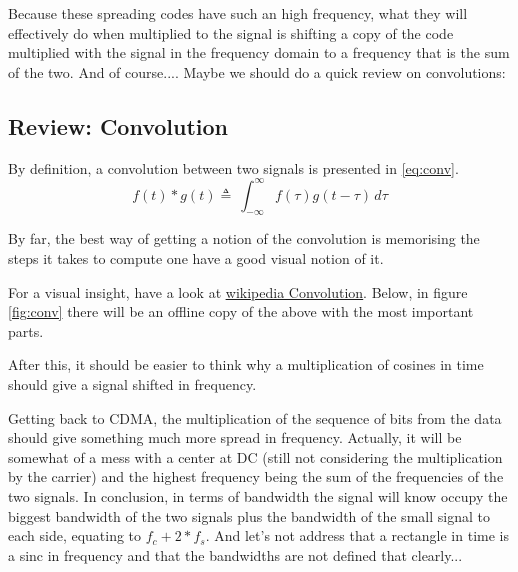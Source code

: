 \documentclass[12pt, a4paper]{article}
\begin{document}
\par Because these spreading codes have such an high frequency, what they will effectively do when multiplied to the signal is shifting a copy of the code multiplied with the signal in the frequency domain to a frequency that is the sum of the two. And of course.... Maybe we should do a quick review on convolutions:


\Vhrulefill
    \subsection{Review: Convolution}
    \par By definition, a convolution between two signals is presented in \eqref{eq:conv}.
    \begin{equation} \label{eq:conv}
        f(t) * g(t)\triangleq \ \int _{-\infty }^{\infty }f(\tau )g(t-\tau )\,d\tau
    \end{equation}

    \par By far, the best way of getting a notion of the convolution is memorising the steps it takes to compute one have a good visual notion of it.
    
    \par For a visual insight, have a look at \href{https://en.wikipedia.org/wiki/Convolution#Visual_explanation}{\ul{wikipedia Convolution}}. Below, in figure \ref{fig:conv} there will be an offline copy of the above with the most important parts.


    \par After this, it should be easier to think why a multiplication of cosines in time should give a signal shifted in frequency.

\Vhrulefill


\vspace{2cm}
\par Getting back to CDMA, the multiplication of the sequence of bits from the data should give something much more spread in frequency. Actually, it will be somewhat of a mess with a center at DC (still not considering the multiplication by the carrier) and the highest frequency being the sum of the frequencies of the two signals. In conclusion, in terms of bandwidth the signal will know occupy the biggest bandwidth of the two signals plus the bandwidth of the small signal to each side, equating to $f_c + 2 * f_s$. And let's not address that a rectangle in time is a sinc in frequency and that the bandwidths are not defined that clearly...
\Vhrulefill
\end{document}
